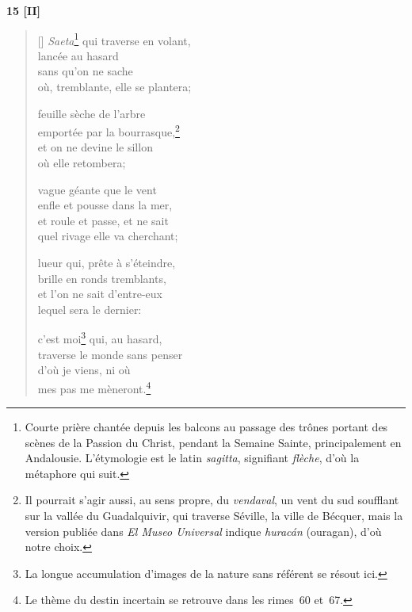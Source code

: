 \documentclass[a4paper,12pt]{book}
\begin{document}
\bigskip

\begin{center}
  \textbf{15 [II]}
\end{center}

\settowidth{\versewidth}{où, tremblante, elle se plantera;}

\begin{verse}[\versewidth]
  \emph{Saeta}\footnote{Courte prière chantée
  depuis les balcons au passage des trônes portant des scènes de la
  Passion du Christ, pendant la Semaine Sainte, principalement en
  Andalousie. L'étymologie est le latin \emph{sagitta},
  signifiant \emph{flèche}, d'où la métaphore qui suit.} qui traverse
  en volant, \\
  lancée au hasard \\
  sans qu'on ne sache \\
  où, tremblante, elle se plantera;

  feuille sèche de l'arbre \\
  emportée par la bourrasque,\footnote{Il pourrait s'agir aussi, au
  sens propre, du \emph{vendaval}, un vent du sud soufflant sur la
  vallée du Guadalquivir, qui traverse Séville, la ville de Bécquer,
  mais la version publiée dans \emph{El Museo Universal} indique
  \emph{huracán} (ouragan), d'où notre choix.} \\
  et on ne devine le sillon \\
  où elle retombera;

  vague géante que le vent \\
  enfle et pousse dans la mer, \\
  et roule et passe, et ne sait \\
  quel rivage elle va cherchant;

  lueur qui, prête à s'éteindre, \\
  brille en ronds tremblants, \\
  et l'on ne sait d'entre-eux \\
  lequel sera le dernier:

  c'est moi\footnote{La longue accumulation d'images de la nature sans
  référent se résout ici.} qui, au hasard, \\
  traverse le monde sans penser \\
  d'où je viens, ni où \\
  mes pas me mèneront.\footnote{Le thème du destin incertain se
  retrouve dans les rimes~60 et~67.}
\end{verse}
\end{document}

